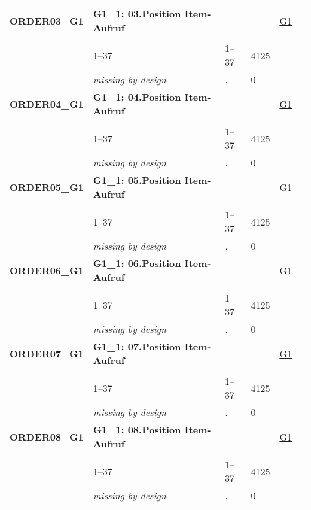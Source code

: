 \begin{longtable}{| L{2.45cm} | L{6cm} | C{1.5cm} | R{1cm} | C{2.25cm} | C{2.25cm} |}
   \midrule
\textbf{ORDER03\_G1}\label{var:ORDER03:G1} & \textbf{G1\_1: 03.Position Item-Aufruf} &  &  & \hyperref[G1]{G1} & \hyperref[var:suf:]{} \\ 
   &  &  &  &  &  \\ 
   & 1--37 & 1--37 & 4125 &  &  \\ 
   & \textit{missing by design} & \textit{.} & 0 &  &  \\ 
   \midrule
\textbf{ORDER04\_G1}\label{var:ORDER04:G1} & \textbf{G1\_1: 04.Position Item-Aufruf} &  &  & \hyperref[G1]{G1} & \hyperref[var:suf:]{} \\ 
   &  &  &  &  &  \\ 
   & 1--37 & 1--37 & 4125 &  &  \\ 
   & \textit{missing by design} & \textit{.} & 0 &  &  \\ 
   \midrule
\textbf{ORDER05\_G1}\label{var:ORDER05:G1} & \textbf{G1\_1: 05.Position Item-Aufruf} &  &  & \hyperref[G1]{G1} & \hyperref[var:suf:]{} \\ 
   &  &  &  &  &  \\ 
   & 1--37 & 1--37 & 4125 &  &  \\ 
   & \textit{missing by design} & \textit{.} & 0 &  &  \\ 
   \midrule
\textbf{ORDER06\_G1}\label{var:ORDER06:G1} & \textbf{G1\_1: 06.Position Item-Aufruf} &  &  & \hyperref[G1]{G1} & \hyperref[var:suf:]{} \\ 
   &  &  &  &  &  \\ 
   & 1--37 & 1--37 & 4125 &  &  \\ 
   & \textit{missing by design} & \textit{.} & 0 &  &  \\ 
   \midrule
\textbf{ORDER07\_G1}\label{var:ORDER07:G1} & \textbf{G1\_1: 07.Position Item-Aufruf} &  &  & \hyperref[G1]{G1} & \hyperref[var:suf:]{} \\ 
   &  &  &  &  &  \\ 
   & 1--37 & 1--37 & 4125 &  &  \\ 
   & \textit{missing by design} & \textit{.} & 0 &  &  \\ 
   \midrule
\textbf{ORDER08\_G1}\label{var:ORDER08:G1} & \textbf{G1\_1: 08.Position Item-Aufruf} &  &  & \hyperref[G1]{G1} & \hyperref[var:suf:]{} \\ 
   &  &  &  &  &  \\ 
   & 1--37 & 1--37 & 4125 &  &  \\ 
   & \textit{missing by design} & \textit{.} & 0 &  &  \\ 

\end{longtable}
